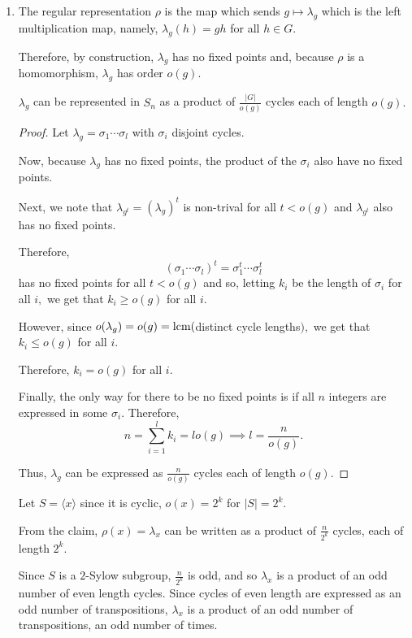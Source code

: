 \documentclass[12pt]{AlgebraQual}
\begin{document}
\begin{solution}$\,$
\begin{enumerate}[label=(\alph*)]
    \item The regular representation $\rho$ is the map which sends $g\mapsto\lambda_g$ which is the left multiplication map, namely, $\lambda_g(h)=gh$ for all $h\in G$.

    Therefore, by construction, $\lambda_g$ has no fixed points and, because $\rho$ is a homomorphism, $\lambda_g$ has order $o(g).$

    \begin{claim} $\lambda_g$ can be represented in $S_n$ as a product of $\frac{|G|}{o(g)}$ cycles each of length $o(g).$
    \begin{proof} Let $\lambda_g=\sigma_1\cdots\sigma_l$ with $\sigma_i$ disjoint cycles.

    Now, because $\lambda_g$ has no fixed points, the product of the $\sigma_i$ also have no fixed points.

    Next, we note that $\lambda_{g^t}=(\lambda_g)^t$ is non-trival for all $t<o(g)$ and $\lambda_{g^t}$ also has no fixed points.

    Therefore, $$(\sigma_1\cdots\sigma_l)^t=\sigma_1^t\cdots\sigma_l^t$$ has no fixed points for all $t<o(g)$ and so, letting $k_i$ be the length of $\sigma_i$ for all $i,$ we get that $k_i\ge o(g)$ for all $i$.

    However, since $o(\lambda_g)=o(g)=\text{lcm}($distinct cycle lengths$),$ we get that $k_i\le o(g)$ for all $i.$

    Therefore, $k_i=o(g)$ for all $i.$

    Finally, the only way for there to be no fixed points is if all $n$ integers are expressed in some $\sigma_i.$ Therefore, $$n=\sum_{i=1}^lk_i=lo(g)\implies l=\frac{n}{o(g)}.$$

    Thus, $\lambda_g$ can be expressed as $\frac{n}{o(g)}$ cycles each of length $o(g).$
    \end{proof}
    \end{claim}

    Let $S=\langle x\rangle$ since it is cyclic, $o(x)=2^k$ for $|S|=2^k.$

    From the claim, $\rho(x)=\lambda_x$ can be written as a product of $\frac{n}{2^k}$ cycles, each of length $2^k.$

    Since $S$ is a $2$-Sylow subgroup, $\frac{n}{2^k}$ is odd, and so $\lambda_x$ is a product of an odd number of even length cycles. Since cycles of even length are expressed as an odd number of transpositions, $\lambda_x$ is a product of an odd number of transpositions, an odd number of times.


\end{enumerate}
\end{solution}
\end{document}
